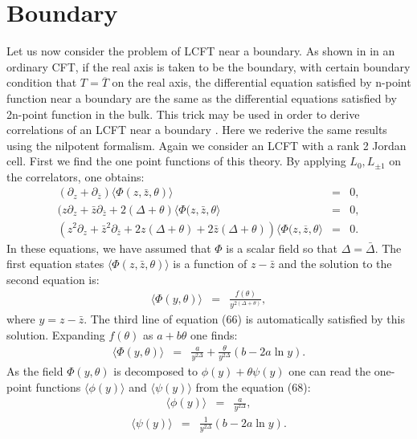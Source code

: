 \documentclass[a4paper,11pt]{article}
\begin{document}
\section{Boundary}
Let us now consider the problem of LCFT near a boundary. As shown
in \cite{Cardy} in an ordinary CFT, if the real axis is taken to
be the boundary, with certain boundary condition that
$T=\overline{T}$ on the real axis, the differential equation
satisfied by n-point function near a boundary are the same as the
differential equations satisfied by 2n-point function in the
bulk. This trick may be used in order to derive correlations of
an LCFT near a boundary \cite{Kogan,MR}. Here we rederive the same
results using the nilpotent formalism. Again we consider an LCFT
with a rank 2 Jordan cell. First we find the one point functions
of this theory. By applying $L_{0},L_{\pm1}$ on the correlators,
one obtains:
\begin{eqnarray}
(\partial_{z}+\partial_{\bar{z}})\langle\Phi(z,\bar{z},\theta)
\rangle&=&0 ,\nonumber\\
(z\partial_{z}+\bar{z}\partial_{\bar{z}}+2(\Delta+\theta)
\langle\Phi(z,\bar{z},\theta\rangle&=&0 ,\nonumber\\
(z^{2}\partial_{z}+\bar{z}^{2}\partial_{\bar{z}}+
2z(\Delta+\theta)+2\bar{z}(\Delta+\theta))\langle
\Phi(z,\overline{z},\theta\rangle&=&0 .
\end{eqnarray}
In these equations, we have assumed that $\Phi$ is a scalar field
so that $\Delta=\bar{\Delta}$. The first equation states
$\langle\Phi(z,\bar{z},\theta)\rangle$ is a function of
$z-\bar{z}$ and the solution to the second equation is:
\begin{eqnarray}
\langle\Phi(y,\theta)\rangle&=&\frac{f(\theta)}{y^{2(\Delta+\theta)}}
,
\end{eqnarray}
where $y=z-\bar{z}$. The third line of equation (66) is
automatically satisfied by this solution. Expanding $f(\theta)$
as $a+b\theta$ one finds:
\begin{eqnarray}
\langle\Phi(y,\theta)\rangle&=&\frac{a}{y^{2\Delta}}+\frac{\theta}{y^{2\Delta}}(b-2a\ln
y).
\end{eqnarray}
As the field $\Phi(y,\theta)$ is decomposed to
$\phi(y)+\theta\psi(y)$ one can read the one-point functions
$\langle\phi(y)\rangle$ and $\langle\psi(y)\rangle$ from the
equation (68):
\begin{eqnarray}
\langle\phi(y)\rangle&=&\frac{a}{y^{2\Delta}},
\end{eqnarray}
\begin{eqnarray}
\langle\psi(y)\rangle&=&\frac{1}{y^{2\Delta}}(b-2a\ln y) .
\end{eqnarray}
\end{document}
